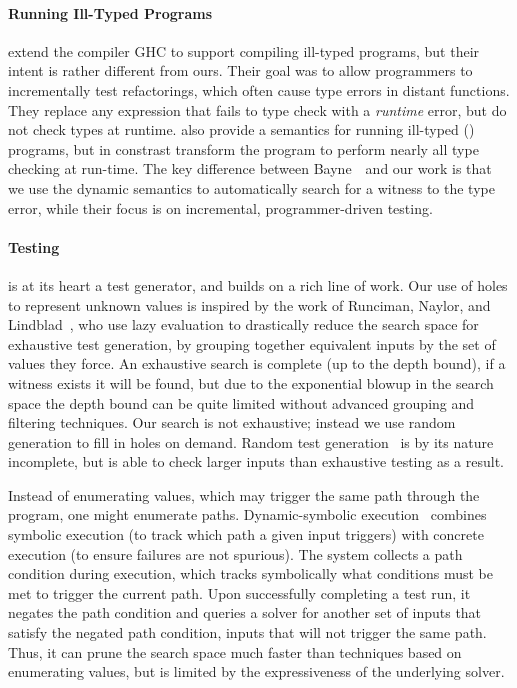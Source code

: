 \paragraph{Running Ill-Typed Programs}
\label{sec:running-ill-typed}
\citet{Vytiniotis2012-gh} extend the \haskell
compiler GHC to support compiling ill-typed programs, but their intent
is rather different from ours. Their goal was to allow programmers to
incrementally test refactorings, which often cause type errors in
distant functions. They replace any expression that fails to type
check with a \emph{runtime} error, but do not check types
at runtime.
%
\citet{Bayne2011-cn} also provide a semantics for running
ill-typed (\java) programs, but in constrast transform the program to
perform nearly all type checking at run-time. The key difference between
Bayne~\etal\ and our work is that we use the dynamic semantics to
automatically search for a witness to the type error, while their focus
is on incremental, programmer-driven testing.

\paragraph{Testing}
\label{sec:testing}
\nanomaly is at its heart a test generator, and builds on a rich line of
work.
%
Our use of holes to represent unknown values is inspired by the work of
Runciman, Naylor, and Lindblad~\cite{Runciman2008-ka,Naylor2007-mi,Lindblad2007-oy},
%
who use lazy evaluation to drastically reduce the search space for
exhaustive test generation, by grouping together equivalent inputs by
the set of values they force. An exhaustive search is complete (up to
the depth bound), if a witness exists it will be found, but due to the
exponential blowup in the search space the depth bound can be quite
limited without advanced grouping and filtering techniques.
%
Our search is not exhaustive; instead we use random generation to fill
in holes on demand.
%
Random test generation~\cite{Claessen2000-lj,Csallner2004-bf,Pacheco2007-at}
%
is by its nature incomplete, but is able to check larger inputs than
exhaustive testing as a result.

Instead of enumerating values, which may trigger the same path through
the program, one might enumerate paths. 
%
Dynamic-symbolic execution~\cite{Godefroid2005-am,Cadar2008-kg,Tillmann2008-qc}
%
combines symbolic execution (to track which path a given input triggers)
with concrete execution (to ensure failures are not spurious). The
system collects a path condition during execution, which tracks
symbolically what conditions must be met to trigger the current
path. Upon successfully completing a test run, it negates the path
condition and queries a solver for another set of inputs that satisfy
the negated path condition, \ie inputs that will not trigger the same
path. Thus, it can prune the search space much faster than techniques
based on enumerating values, but is limited by the expressiveness of the
underlying solver.

